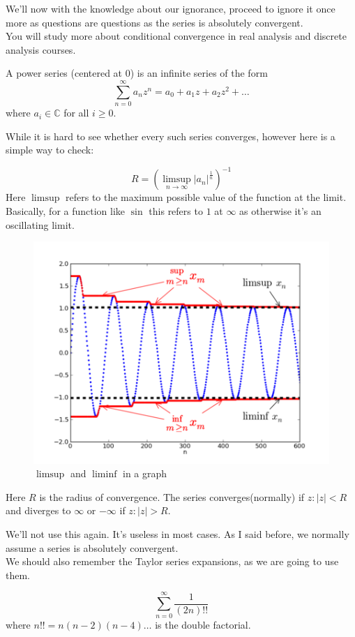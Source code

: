 We'll now with the knowledge about our ignorance, proceed to ignore it once more as questions are questions as the series is absolutely convergent.\\
You will study more about conditional convergence in real analysis and discrete analysis courses.\\
\begin{definition}
A power series (centered at 0) is an infinite series of the form\\
\[\sum^{\infty}_{n=0} a_nz^n=a_0+a_1z+a_2z^2+\dots \]
where $a_i \in \mathbb{C}$ for all $i \geq 0$.
\end{definition}
While it is hard to see whether every such series converges, however here is a simple way to check:\\
\begin{definition}
    \[R = (\limsup_{n \to \infty}|a_n|^{\frac{1}{n}})^{-1}\]
    Here $\limsup$ refers to the maximum possible value of the function at the limit. Basically, for a function like $\sin$ this refers to $1$ at $\infty$ as otherwise it's an oscillating limit.\\
    \begin{figure} [h]
        \centering
        \includegraphics[width=0.5\linewidth]{Photos/Limsup.png}
        \caption{$\limsup$ and $\liminf$ in a graph}
    \end{figure}
    Here $R$ is the radius of convergence. The series converges(normally) if $z: |z| < R$ and diverges to $\infty$ or $-\infty$ if $z: |z| > R$.
\end{definition}
We'll not use this again. It's useless in most cases. As I said before, we normally assume a series is absolutely convergent.\\
We should also remember the Taylor series expansions, as we are going to use them.\\
\begin{example}
    \[\sum^{\infty}_{n=0} \frac{1}{(2n)!!}\]
    where $n!! = n(n-2)(n-4) \dots$ is the double factorial.\\
\end{example}
